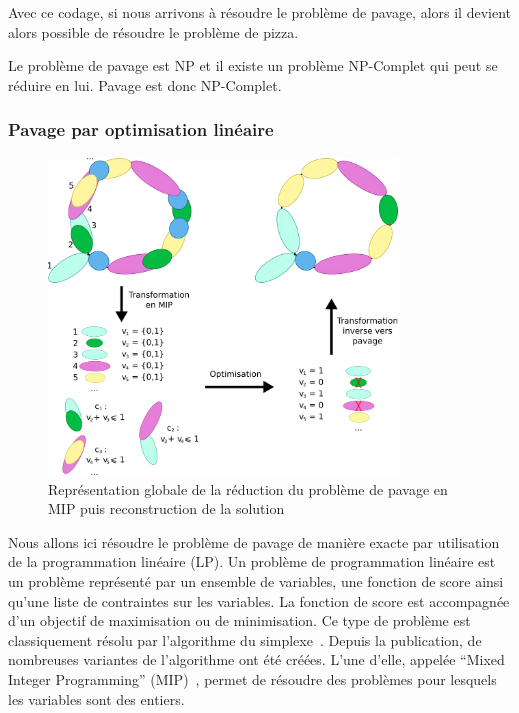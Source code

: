 Avec ce codage, si nous arrivons à résoudre le problème de pavage, alors il devient alors possible de résoudre le problème de pizza.

Le problème de pavage est NP et il existe un problème NP-Complet qui peut se réduire en lui.
Pavage est donc NP-Complet.




\subsubsection{Pavage par optimisation linéaire}

\label{MIP_p}

\begin{figure}[!ht]
  \begin{center}
    \includegraphics[width=350px]{Figures/s2m/pavage/MIP.png}
    \caption{\label{reduction}Représentation globale de la réduction du problème de pavage en MIP puis reconstruction de la
    solution}
  \end{center}
\end{figure}

Nous allons ici résoudre le problème de pavage de manière exacte par utilisation de la programmation linéaire (LP).
Un problème de programmation linéaire est un problème représenté par un ensemble de variables, une fonction de score ainsi qu'une liste de contraintes sur les variables.
La fonction de score est accompagnée d'un objectif de maximisation ou de minimisation.
Ce type de problème est classiquement résolu par l'algorithme du simplexe~\cite{murty_linear_1983}.
Depuis la publication, de nombreuses variantes de l'algorithme ont été créées.
L'une d'elle, appelée ``Mixed Integer Programming'' (MIP)~\cite{wolsey_mixed_2007}, permet de résoudre des problèmes pour lesquels les variables sont des entiers.


